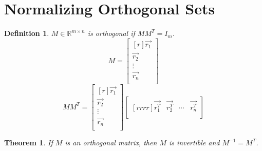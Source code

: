 \documentclass{report}
\newtheorem*{defn}{Definition}
\newtheorem*{thrm}{Theorem}
\begin{document}
\section{Normalizing Orthogonal Sets}
\begin{defn}
$M\in \mathbb{R}^{m\times n}$ is orthogonal if $MM^T=I_m$.
\[ M=\begin{bmatrix}[r]\vec{r_1}\\\vec{r_2}\\\vdots\\\vec{r_n}\\\end{bmatrix} \]
\[ MM^T = \begin{bmatrix}[r]\vec{r_1}\\\vec{r_2}\\\vdots\\\vec{r_n}\\\end{bmatrix}\begin{bmatrix}[rrrr]\vec{r_1^T} & \vec{r_2^T} & \cdots & \vec{r_n^T}\\\end{bmatrix} \]
\end{defn}
\begin{thrm}
If $M$ is an orthogonal matrix, then $M$ is invertible and $M^{-1}=M^T$.
\end{thrm}
\end{document}
